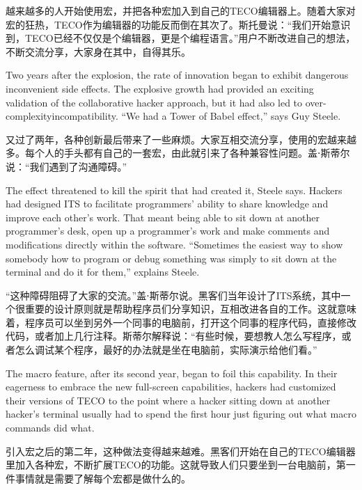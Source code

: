 \ifdefined\chs
越来越多的人开始使用宏，并把各种宏加入到自己的TECO编辑器上。随着大家对宏的狂热，TECO作为编辑器的功能反而倒在其次了。斯托曼说：``我们开始意识到，TECO已经不仅仅是个编辑器，更是个编程语言。''用户不断改进自己的想法，不断交流分享，大家身在其中，自得其乐。
\fi

\ifdefined\eng
Two years after the explosion, the rate of innovation began to exhibit \ifdefined\vone dangerous \fi\ifdefined\vtwo inconvenient \fi side effects. The explosive growth had provided an exciting validation of the collaborative hacker approach, but it had also led to \ifdefined\vone over-complexity\fi\ifdefined\vtwo incompatibility\fi . ``We had a Tower of Babel effect,'' says Guy Steele.
\fi

\ifdefined\chs
又过了两年，各种创新最后带来了一些麻烦。大家互相交流分享，使用的宏越来越多。每个人的手头都有自己的一套宏，由此就引来了各种兼容性问题。盖⋅斯蒂尔说：``我们遇到了沟通障碍。''
\fi

\ifdefined\eng
The effect threatened to kill the spirit that had created it, Steele says. Hackers had designed ITS to facilitate programmers' ability to share knowledge and improve each other's work. That meant being able to sit down at another programmer's desk, open up a programmer's work and make comments and modifications directly within the software. ``Sometimes the easiest way to show somebody how to program or debug something was simply to sit down at the terminal and do it for them,'' explains Steele.
\fi

\ifdefined\chs
``这种障碍阻碍了大家的交流。''盖⋅斯蒂尔说。黑客们当年设计了ITS系统，其中一个很重要的设计原则就是帮助程序员们分享知识，互相改进各自的工作。这就意味着，程序员可以坐到另外一个同事的电脑前，打开这个同事的程序代码，直接修改代码，或者加上几行注释。斯蒂尔解释说：``有些时候，要想教人怎么写程序，或者怎么调试某个程序，最好的办法就是坐在电脑前，实际演示给他们看。''
\fi

\ifdefined\eng
The macro feature, after its second year, began to foil this capability. In their eagerness to embrace the new full-screen capabilities, hackers had customized their versions of TECO to the point where a hacker sitting down at another hacker's terminal usually had to spend the first hour just figuring out what macro commands did what.
\fi

\ifdefined\chs
引入宏之后的第二年，这种做法变得越来越难。黑客们开始在自己的TECO编辑器里加入各种宏，不断扩展TECO的功能。这就导致人们只要坐到一台电脑前，第一件事情就是需要了解每个宏都是做什么的。
\fi

